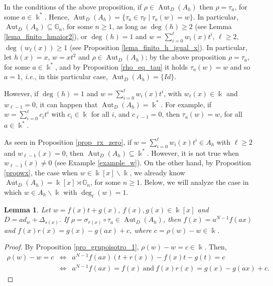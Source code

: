 \documentclass{article}
\numberwithin{equation}{section}\theoremstyle{plain}
\newtheorem{lemma}[theorem]{Lemma}
\DeclareMathOperator{\Aut}{Aut}
\begin{document}
\medbreak

 In the conditions of the above proposition, if $\rho \in \Aut_D(A_h)$ then $\rho = \tau_a$, for some $a \in \Bbbk^\ast$.
 Hence, $\Aut_{D}(A_h) = \{ \tau_a \in \tau_{\mathbb{P}} \ | \ \tau_a(w)=w\}.$
 In particular, $\Aut_{D}(A_h) \subseteq \mathbb{G}_n$, for some $n \geq 1$, as long as $\deg(h) \geq 2$ (see Lemma \ref{lema_finito_hmaior2}), or $\deg(h)=1$ and $w=\sum_{i=0}^\ell w_i(x) t^i$, $\ell\geq 2$, $\deg(w_\ell(x))\geq 1$ (see Proposition \ref{lema_finito_h_igual_x}).
  In particular, let $h(x)=x$, $w = xt^2$ and $\rho \in \Aut_D(A_h)$; by the above proposition $\rho = \tau_a$, for some $a \in \Bbbk^\ast$, and by Proposition \ref{rho_eq_tau} it holds $\tau_a(w)=w$ and so $a=1$, \emph{i.e.}, in this particular case, $\Aut_D(A_h)=\{Id\}$.
 
However, if
 $\deg(h)=1$ and $w=\sum_{i=0}^\ell w_i(x) t^i$, with $w_\ell(x)\in\Bbbk$ and $w_{\ell-1}=0$, it can happen that $\Aut_D(A_h) = \Bbbk^\ast$.
 For example, if $w=\sum_{i=0}^\ell c_i t^i$ with $c_i\in \Bbbk$ for all $i$, and $c_{\ell-1}=0$, then $\tau_a(w) = w$, for all $a\in\Bbbk^*$.

 
 
  



  \medbreak


As seen in Proposition \ref{prop_rx_zero}, if $w=\sum_{i=0}^\ell w_i(x)t^i\in A_h$ with $\ell \geq 2$ and $w_{\ell-1} (x) = 0$, then $\Aut_D(A_h) \subseteq \Bbbk^\ast$.
  However, it is not true when $w_{\ell-1} (x) \neq 0$ (see Example \ref{example_w}).
On the other hand, by Proposition \ref{propwx}, the case when $w \in \Bbbk[x] \backslash \Bbbk$, we already know $\Aut_D(A_h)=\Bbbk[x] \rtimes \mathbb{G}_n$, for some $n\geq 1$.
Below, we will analyze the case in which $w \in A_h\backslash \Bbbk$ with $\deg_{t}(w)=1$.


\begin{lemma} \label{lema_wlinear} Let $w= f(x)t+g(x), \ f(x), g(x)\in \Bbbk[x]$ and $D=ad_w + \Delta_{s(x)}$. 
    If $\rho = \sigma_{r(x)} \circ \tau_a \in \Aut_D(A_h)$, then $f(x)=a^{N-1}f(ax)$ and $f(x)r(x)=g(x)-g(ax)+c$, where $c = \rho(w) - w \in \Bbbk$.
\end{lemma}
\begin{proof}
    By Proposition \ref{pro_grupoisotro_1}, $\rho(w)-w=c\in \Bbbk$. Then,
\begin{eqnarray*}
    \rho(w)-w=c&\Longleftrightarrow&a^{N-1}f(ax)(t+r(x))-f(x)t-g(t)=c\\
    &\Longleftrightarrow& a^{N-1}f(ax)=f(x) \  \mbox{and} \ f(x)r(x)=g(x)-g(ax)+c.
    \end{eqnarray*}
\end{proof}
\end{document}
